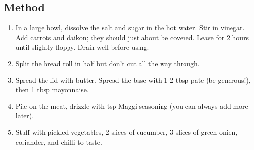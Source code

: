 \subsection{Method}

\begin{enumerate}
    \item In a large bowl, dissolve the salt and sugar in the hot water. Stir in vinegar. Add carrots and daikon; they should just about be covered. Leave for 2 hours until slightly floppy. Drain well before using.
    \item Split the bread roll in half but don't cut all the way through.
    \item Spread the lid with butter. Spread the base with 1-2 tbsp pate (be generous!), then 1 tbsp mayonnaise.
    \item Pile on the meat, drizzle with  tsp Maggi seasoning (you can always add more later).
    \item Stuff with pickled vegetables, 2 slices of cucumber, 3 slices of green onion, coriander, and chilli to taste.

\end{enumerate}
